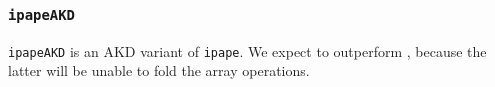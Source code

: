 \subsubsection{\tt ipapeAKD}
\label{benchmarkipapeAKD}

{\tt ipapeAKD} is an AKD variant of {\tt ipape}.
We expect \awlf to outperform \wlf, because the
latter will be unable to fold the array operations.
